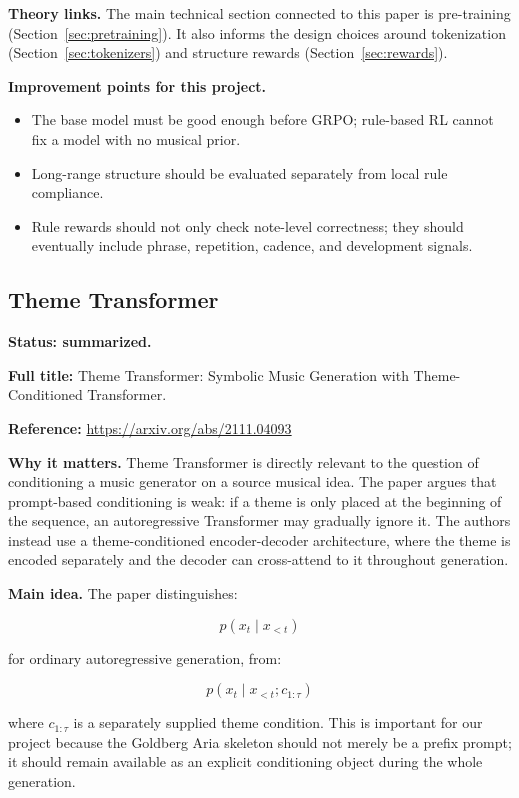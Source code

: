 \documentclass[11pt]{article}
\begin{document}
\textbf{Theory links.}
The main technical section connected to this paper is pre-training
(Section~\ref{sec:pretraining}). It also informs the design choices around
tokenization (Section~\ref{sec:tokenizers}) and structure rewards
(Section~\ref{sec:rewards}).

\textbf{Improvement points for this project.}
\begin{itemize}[leftmargin=*]
  \item The base model must be good enough before GRPO; rule-based RL cannot fix
  a model with no musical prior.
  \item Long-range structure should be evaluated separately from local rule
  compliance.
  \item Rule rewards should not only check note-level correctness; they should
  eventually include phrase, repetition, cadence, and development signals.
\end{itemize}

\subsection{Theme Transformer}
\label{sec:paper-theme-transformer}

\textbf{Status: summarized.}

\textbf{Full title:} Theme Transformer: Symbolic Music Generation with
Theme-Conditioned Transformer.

\textbf{Reference:}
\url{https://arxiv.org/abs/2111.04093}

\textbf{Why it matters.}
Theme Transformer is directly relevant to the question of conditioning a music
generator on a source musical idea. The paper argues that prompt-based
conditioning is weak: if a theme is only placed at the beginning of the sequence,
an autoregressive Transformer may gradually ignore it. The authors instead use a
theme-conditioned encoder-decoder architecture, where the theme is encoded
separately and the decoder can cross-attend to it throughout generation.

\textbf{Main idea.}
The paper distinguishes:

\[
p(x_t \mid x_{<t})
\]

for ordinary autoregressive generation, from:

\[
p(x_t \mid x_{<t}; c_{1:\tau})
\]

where \(c_{1:\tau}\) is a separately supplied theme condition. This is important
for our project because the Goldberg Aria skeleton should not merely be a prefix
prompt; it should remain available as an explicit conditioning object during the
whole generation.
\end{document}
